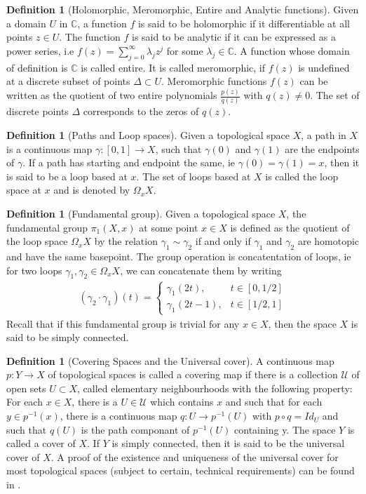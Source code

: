 \documentclass[11pt]{report}
\theoremstyle{definition}
\newtheorem{defn}[thm]{Definition}
\begin{document}
\begin{defn}[Holomorphic, Meromorphic, Entire and Analytic functions]
  Given a domain $U$ in $\mathbb{C}$, a function $f$ is said to be holomorphic if it differentiable at all points $z \in U$. The function $f$ is said to be analytic if it can be expressed as a power series, i.e $f(z) = \sum\limits^{\infty}_{j=0}\lambda_jz^j$ for some $\lambda_j \in \mathbb{C}$. A function whose domain of definition is $\mathbb{C}$ is called entire. It is called meromorphic, if $f(z)$ is undefined at a discrete subset of points $\Delta \subset U$. Meromorphic functions $f(z)$ can be written as the quotient of two entire polynomials $\frac{p(z)}{q(z)}$ with $q(z) \neq 0$. The set of discrete points $\Delta$ corresponds to the zeros of $q(z)$.
\end{defn}
\begin{defn}[Paths and Loop spaces]
  Given a topological space $X$, a path in $X$ is a continuous map $\gamma \colon [0,1] \rightarrow X$, such that $\gamma(0)$ and $\gamma(1)$ are the endpoints of $\gamma$. If a path has starting and endpoint the same, ie $\gamma(0)=\gamma(1) = x$, then it is said to be a loop based at $x$. The set of loops based at $X$ is called the loop space at $x$ and is denoted by $\Omega_xX$.
\end{defn}
\begin{defn}[Fundamental group]
  Given a topological space $X$, the fundamental group $\pi_1(X,x)$ at some point $x \in X$ is defined as the quotient of the loop space $\Omega_xX$ by the relation $\gamma_1 \sim\gamma_2$ if and only if $\gamma_1$ and $\gamma_2$ are homotopic and have the same basepoint. The group operation is concatentation of loops, ie for two loops $\gamma_1,\gamma_2 \in \Omega_xX$, we can concatenate them by writing 
  \begin{align*}
    (\gamma_2\cdot\gamma_1)(t) = \begin{cases}
      \gamma_1(2t), &t \in [0,1/2] \\
      \gamma_1(2t-1), &t \in [1/2,1]
    \end{cases}
  \end{align*}
  Recall that if this fundamental group is trivial for any $x \in X$, then the space $X$ is said to be simply connected.
\end{defn}
\begin{defn}[Covering Spaces and the Universal cover]
  A continuous map $p\colon Y \rightarrow X$ of topological spaces is called a covering map if there is a collection $\mathcal{U}$ of open sets $U \subset X$, called elementary neighbourhoods with the following property: For each $x \in X$, there is a $U\in \mathcal{U}$ which contains $x$ and such that for each $y \in p^{-1}(x)$, there is a continuous map $q:U \rightarrow p^{-1}(U)$ with $p\circ q = Id_U$ and such that $q(U)$ is the path componant of $p^{-1}(U)$ containing y. The space $Y$ is called a cover of $X$. If $Y$ is simply connected, then it is said to be the universal cover of $X$.  A proof of the existence and uniqueness of the universal cover for most topological spaces (subject to certain, technical requirements) can be found in \cite[p.63]{Hatchers}.
\end{defn}
\end{document}
